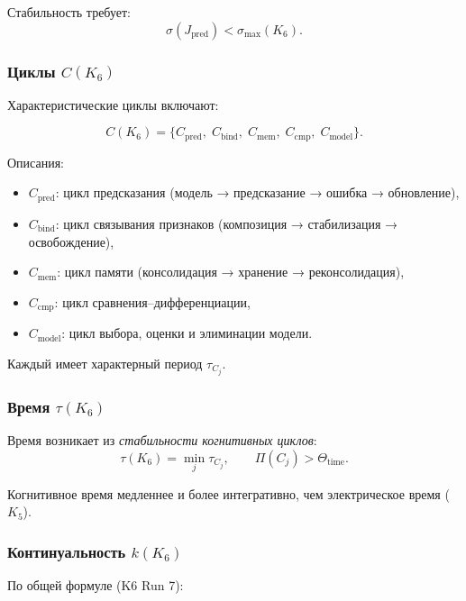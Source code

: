 Стабильность требует:
\[
\sigma(J_{\mathrm{pred}}) < \sigma_{\max}(K_6).
\]

\subsubsection{Циклы \texorpdfstring{$C(K_6)$}{C(K_6)}}

Характеристические циклы включают:

\[
C(K_6) =
\{
C_{\mathrm{pred}},\;
C_{\mathrm{bind}},\;
C_{\mathrm{mem}},\;
C_{\mathrm{cmp}},\;
C_{\mathrm{model}}
\}.
\]

Описания:
\begin{itemize}
    \item $C_{\mathrm{pred}}$: цикл предсказания (модель → предсказание →
          ошибка → обновление),
    \item $C_{\mathrm{bind}}$: цикл связывания признаков (композиция →
          стабилизация → освобождение),
    \item $C_{\mathrm{mem}}$: цикл памяти (консолидация → хранение →
          реконсолидация),
    \item $C_{\mathrm{cmp}}$: цикл сравнения–дифференциации,
    \item $C_{\mathrm{model}}$: цикл выбора, оценки и элиминации модели.
\end{itemize}

Каждый имеет характерный период $\tau_{C_j}$.

\subsubsection{Время \texorpdfstring{$\tau(K_6)$}{\tau(K_6)}}

Время возникает из \emph{стабильности когнитивных циклов}:
\[
\tau(K_6)
= \min_j \tau_{C_j},
\qquad
\Pi(C_j) > \Theta_{\mathrm{time}}.
\]

Когнитивное время медленнее и более интегративно, чем электрическое
время ($K_5$).

\subsubsection{Континуальность \texorpdfstring{$k(K_6)$}{k(K_6)}}

По общей формуле (K6 Run 7):

